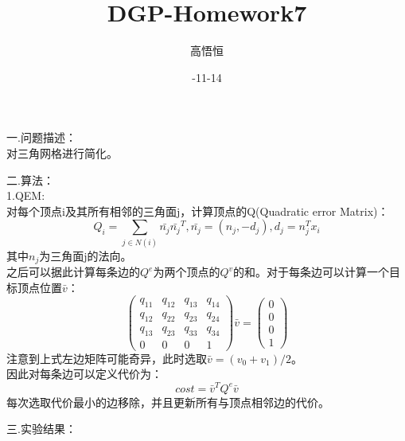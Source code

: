 \documentclass[a4paper]{ltxdoc}
\begin{document}
\title{DGP-Homework7}
\author{高悟恒 }
\date{-11-14}
\maketitle



一.问题描述：\\
对三角网格进行简化。

二.算法：\\
1.QEM:\\
对每个顶点i及其所有相邻的三角面j，计算顶点的Q(Quadratic error Matrix)：
\begin{equation}
Q_i=\sum_{j\in N(i)}\bar{n_j}\bar{n_j}^T,\bar{n_j}=(n_j,-d_j),d_j=n_j^Tx_i
\end{equation}
其中$n_j$为三角面j的法向。\\
之后可以据此计算每条边的$Q^e$为两个顶点的$Q^v$的和。对于每条边可以计算一个目标顶点位置$\bar{v}$：
\begin{equation}
\begin{pmatrix}q_{11}&q_{12}&q_{13}&q_{14}\\q_{12}&q_{22}&q_{23}&q_{24}\\q_{13}&q_{23}&q_{33}&q_{34}\\0&0&0&1\end{pmatrix}\bar{v}=\begin{pmatrix}0\\0\\0\\1\end{pmatrix}
\end{equation}
注意到上式左边矩阵可能奇异，此时选取$\bar{v}=(v_0+v_1)/2$。\\
因此对每条边可以定义代价为：
\begin{equation}
cost=\bar{v}^TQ^e\bar{v}
\end{equation}
每次选取代价最小的边移除，并且更新所有与顶点相邻边的代价。




三.实验结果：
\end{document}
